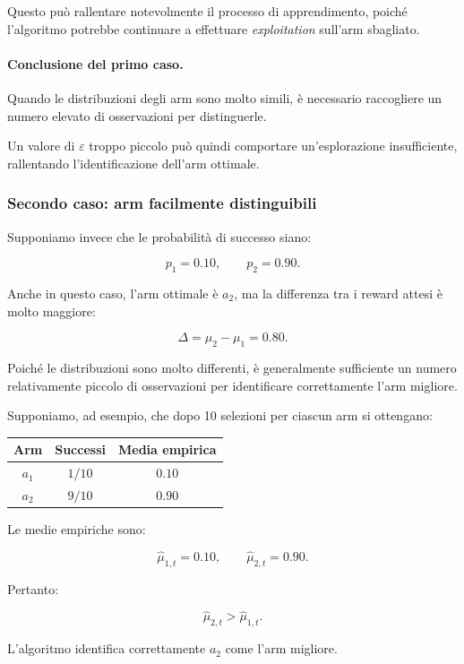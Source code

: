 Questo può rallentare notevolmente il processo di apprendimento,
poiché l'algoritmo potrebbe continuare a effettuare
\textit{exploitation} sull'arm sbagliato.

\paragraph{Conclusione del primo caso.}

Quando le distribuzioni degli arm sono molto simili, è necessario
raccogliere un numero elevato di osservazioni per distinguerle.

Un valore di $\varepsilon$ troppo piccolo può quindi comportare
un'esplorazione insufficiente, rallentando l'identificazione
dell'arm ottimale.

\subsubsection{Secondo caso: arm facilmente distinguibili}

Supponiamo invece che le probabilità di successo siano:

\[
p_1=0.10,
\qquad
p_2=0.90.
\]

Anche in questo caso, l'arm ottimale è $a_2$, ma la differenza
tra i reward attesi è molto maggiore:

\[
\Delta=\mu_2-\mu_1=0.80.
\]

Poiché le distribuzioni sono molto differenti, è generalmente
sufficiente un numero relativamente piccolo di osservazioni
per identificare correttamente l'arm migliore.

Supponiamo, ad esempio, che dopo 10 selezioni per ciascun arm
si ottengano:

\begin{center}
\begin{tabular}{|c|c|c|}
\hline
\textbf{Arm} & \textbf{Successi} & \textbf{Media empirica} \\
\hline
$a_1$ & $1/10$ & $0.10$ \\
\hline
$a_2$ & $9/10$ & $0.90$ \\
\hline
\end{tabular}
\end{center}

Le medie empiriche sono:

\[
\hat{\mu}_{1,t}=0.10,
\qquad
\hat{\mu}_{2,t}=0.90.
\]

Pertanto:

\[
\hat{\mu}_{2,t}>\hat{\mu}_{1,t}.
\]

L'algoritmo identifica correttamente $a_2$ come l'arm migliore.

